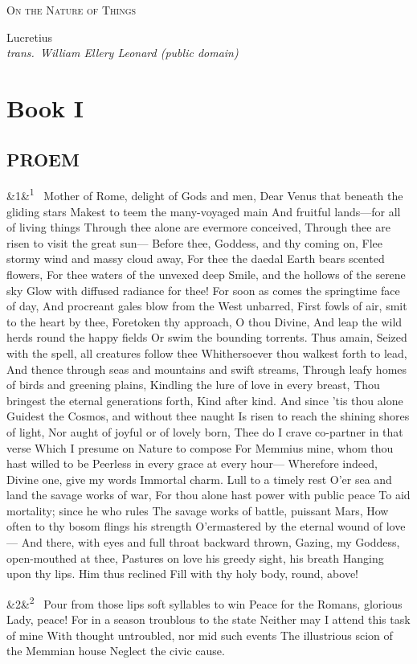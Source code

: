 \documentclass[12pt]{article}
\newcommand{\work}[1]{\begin{center}\LARGE\scshape #1\end{center}}
\newcommand{\attrib}[2]{\begin{center}\large #1\\[2pt]\small\itshape trans.\ #2\end{center}\vspace{1em}}
\newcommand{\para}[1][]{\par\noindent\ifx&#1&\else\textsuperscript{\footnotesize #1}~\fi}
\begin{document}
\work{On the Nature of Things}
\attrib{Lucretius}{William Ellery Leonard (public domain)}

\section*{Book I}

\subsection*{PROEM}

\para[1] Mother of Rome, delight of Gods and men, Dear Venus that beneath the gliding stars Makest to teem the many-voyaged main And fruitful lands---for all of living things Through thee alone are evermore conceived, Through thee are risen to visit the great sun--- Before thee, Goddess, and thy coming on, Flee stormy wind and massy cloud away, For thee the daedal Earth bears scented flowers, For thee waters of the unvexed deep Smile, and the hollows of the serene sky Glow with diffused radiance for thee! For soon as comes the springtime face of day, And procreant gales blow from the West unbarred, First fowls of air, smit to the heart by thee, Foretoken thy approach, O thou Divine, And leap the wild herds round the happy fields Or swim the bounding torrents. Thus amain, Seized with the spell, all creatures follow thee Whithersoever thou walkest forth to lead, And thence through seas and mountains and swift streams, Through leafy homes of birds and greening plains, Kindling the lure of love in every breast, Thou bringest the eternal generations forth, Kind after kind. And since 'tis thou alone Guidest the Cosmos, and without thee naught Is risen to reach the shining shores of light, Nor aught of joyful or of lovely born, Thee do I crave co-partner in that verse Which I presume on Nature to compose For Memmius mine, whom thou hast willed to be Peerless in every grace at every hour--- Wherefore indeed, Divine one, give my words Immortal charm. Lull to a timely rest O'er sea and land the savage works of war, For thou alone hast power with public peace To aid mortality; since he who rules The savage works of battle, puissant Mars, How often to thy bosom flings his strength O'ermastered by the eternal wound of love--- And there, with eyes and full throat backward thrown, Gazing, my Goddess, open-mouthed at thee, Pastures on love his greedy sight, his breath Hanging upon thy lips. Him thus reclined Fill with thy holy body, round, above!

\para[2] Pour from those lips soft syllables to win Peace for the Romans, glorious Lady, peace! For in a season troublous to the state Neither may I attend this task of mine With thought untroubled, nor mid such events The illustrious scion of the Memmian house Neglect the civic cause.
\end{document}
